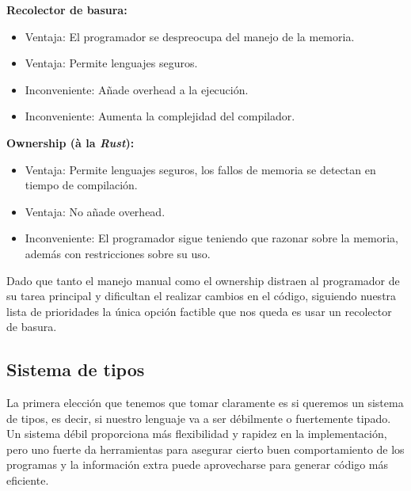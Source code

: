 \textbf{Recolector de basura:}

\begin{itemize}
  \item {\color{okgreen} Ventaja}: El programador se despreocupa del manejo de la memoria.\\
  \item {\color{okgreen} Ventaja}: Permite lenguajes seguros.\\
  \item {\color{myred} Inconveniente}: Añade overhead a la ejecución.\\
  \item {\color{myred} Inconveniente}: Aumenta la complejidad del compilador.\\
\end{itemize}

\textbf{Ownership (à la \textit{Rust}):}

\begin{itemize}
  \item {\color{okgreen} Ventaja}: Permite lenguajes seguros, los fallos de memoria se detectan en tiempo de compilación.\\
  \item {\color{okgreen} Ventaja}: No añade overhead.\\
  \item {\color{myred} Inconveniente}: El programador sigue teniendo que razonar sobre la memoria, además con restricciones sobre su uso.\\
\end{itemize}

Dado que tanto el manejo manual como el ownership distraen al programador de su tarea principal y dificultan el realizar cambios en el código, siguiendo nuestra lista de prioridades la única opción factible que nos queda es usar un recolector de basura.\\


\subsection{Sistema de tipos}
La primera elección que tenemos que tomar claramente es si queremos un sistema de tipos, es decir, si nuestro lenguaje va a ser débilmente o fuertemente tipado.\\

Un sistema débil proporciona más flexibilidad y rapidez en la implementación, pero uno fuerte da herramientas para asegurar cierto buen comportamiento de los programas y la información extra puede aprovecharse para generar código más eficiente.\\

